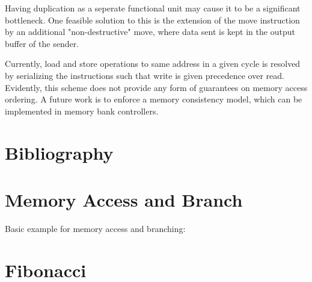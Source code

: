 \documentclass[adraft]{eptcs}
\begin{document}
	
		Having duplication as a seperate functional unit may cause it to be a significant bottleneck.
		One feasible solution to this is the extension of the move instruction by an additional "non-destructive" move, where data sent is kept in the output buffer of the sender.
		
		
		Currently, load and store operations to same address in a given cycle is resolved by serializing the instructions such that write is given precedence over read. Evidently, this scheme does not provide any form of guarantees on memory access ordering.
		A future work is to enforce a memory consistency model, which can be implemented in memory bank controllers.
		

	\newpage
	\section{Bibliography}
		
		
	\newpage
	
	\begin{appendices}
		\section{Memory Access and Branch}
			\label{app:simple}
			Basic example for memory access and branching:
			
		
		\newpage
		\section{Fibonacci}
			\label{app:fib}
			
	\end{appendices}
	
\end{document}
